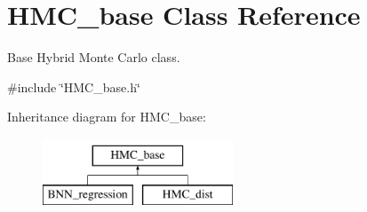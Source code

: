 \hypertarget{class_h_m_c__base}{\section{H\-M\-C\-\_\-base Class Reference}
\label{class_h_m_c__base}
}


Base Hybrid Monte Carlo class.  




{\ttfamily \#include \char`\"{}H\-M\-C\-\_\-base.\-h\char`\"{}}

Inheritance diagram for H\-M\-C\-\_\-base\-:\begin{figure}[H]
\begin{center}
\leavevmode
\includegraphics[height=2.000000cm]{class_h_m_c__base}
\end{center}
\end{figure}
